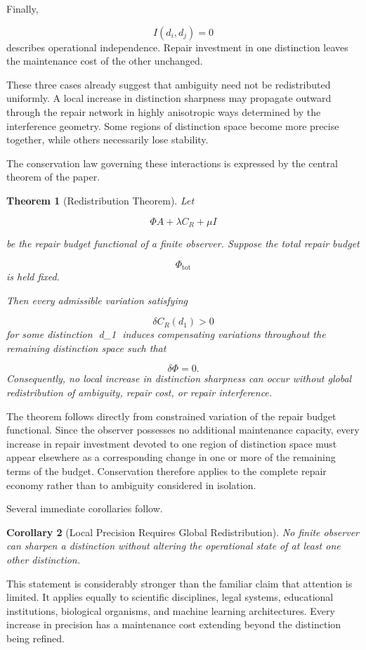 \documentclass[12pt,oneside]{article}
\theoremstyle{plain}
\newtheorem{theorem}{Theorem}[section]
\newtheorem{corollary}[theorem]{Corollary}
\theoremstyle{definition}
\theoremstyle{remark}
\begin{document}
Finally,

\[
I(d_i,d_j)=0
\]
describes operational independence. Repair investment in one distinction leaves the maintenance cost of the other unchanged.

These three cases already suggest that ambiguity need not be redistributed uniformly. A local increase in distinction sharpness may propagate outward through the repair network in highly anisotropic ways determined by the interference geometry. Some regions of distinction space become more precise together, while others necessarily lose stability.

The conservation law governing these interactions is expressed by the central theorem of the paper.

\begin{theorem}[Redistribution Theorem]
Let

\[
\Phi
A
+
\lambda C_R
+
\mu I
\]

be the repair budget functional of a finite observer. Suppose the total repair budget

\[
\Phi_{\mathrm{tot}}
\]
is held fixed.

Then every admissible variation satisfying

\[
\delta C_R(d_1)>0
\]
for some distinction d_1 induces compensating variations throughout the remaining distinction space such that

\[
\delta\Phi=0.
\]
Consequently, no local increase in distinction sharpness can occur without global redistribution of ambiguity, repair cost, or repair interference.
\end{theorem}

The theorem follows directly from constrained variation of the repair budget functional. Since the observer possesses no additional maintenance capacity, every increase in repair investment devoted to one region of distinction space must appear elsewhere as a corresponding change in one or more of the remaining terms of the budget. Conservation therefore applies to the complete repair economy rather than to ambiguity considered in isolation.

Several immediate corollaries follow.

\begin{corollary}[Local Precision Requires Global Redistribution]
No finite observer can sharpen a distinction without altering the operational state of at least one other distinction.
\end{corollary}

This statement is considerably stronger than the familiar claim that attention is limited. It applies equally to scientific disciplines, legal systems, educational institutions, biological organisms, and machine learning architectures. Every increase in precision has a maintenance cost extending beyond the distinction being refined.
\end{document}
